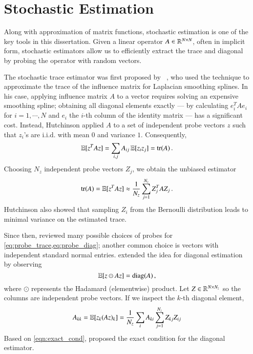 \section{Stochastic Estimation}\label{pre:ste}

Along with approximation of matrix functions, stochastic estimation is
one of the key tools in this dissertation. Given a linear operator $A\in\mathbb{R}^
{N\mathbin{\times} N}$, often in implicit form, stochastic estimators allow us to
efficiently extract the trace and diagonal by probing the operator with random
vectors. 

The stochastic trace estimator was first proposed by~
\citet{hutchinson1990stochastic}, who used the technique to approximate the
trace of the influence matrix for Laplacian smoothing splines. In his case,
applying influence matrix $A$ to a vector requires solving an expensive
smoothing spline; obtaining all diagonal elements exactly --- by calculating
$e_i^TAe_i$ for $i=1,\cdots, N$ and $e_i$ the $i$\hyp{}th column of the identity
matrix --- has a significant cost. Instead, Hutchinson applied $A$ to a set of
independent probe vectors $z$ such that $z_i$'s are i.i.d. with mean $0$ and
variance $1$. Consequently, 
\begin{equation}\label{eq:probe_trace}
	\operatorname{\mathbb{E}}[z^TAz] = \sum_{i,j}A_{ij}\operatorname{\mathbb{E}}[z_iz_j] = \operatorname{tr}(A)\,.
\end{equation}
Choosing $N_z$ independent probe vectors $Z_j$, we obtain the unbiased estimator
\begin{equation}\label{eqn:trace_est}
	\operatorname{tr}(A) = \operatorname{\mathbb{E}}[z^TAz] \approx \frac{1}{N_z}\sum_{j=1}^{N_z}Z_j^TAZ_j\,.
\end{equation}
Hutchinson also showed that sampling $Z_i$ from the Bernoulli distribution
leads to minimal variance on the estimated trace.

Since then, \citet{avron2011randomized} reviewed many possible choices of probes
for \cref{eq:probe_trace,eq:probe_diag}; another common choice is vectors with
independent standard normal entries. \citet{bekas2007estimator} extended the idea for diagonal estimation by
observing
\begin{equation}\label{eq:probe_diag}
	\operatorname{\mathbb{E}}[z\odot Az] = \operatorname{diag}(A)\,,
\end{equation}
where $\odot$ represents the Hadamard (elementwise) product. Let $Z\in\mathbb{R}^
{N\mathbin{\times} N_z}$ so the columns are independent probe vectors. If we inspect the
$k$\hyp{}th diagonal element,
\begin{equation}\label{eqn:exact_cond}
	A_{kk} = \operatorname{\mathbb{E}}[z_k(Az)_k] = \frac{1}{N_z}\sum_{i}A_{ki}\sum_{j=1}^{N_z}Z_{kj}Z_
	{ij}
\end{equation}
Based on \cref{eqn:exact_cond}, \citet{bekas2007estimator} proposed the exact
condition for the diagonal estimator.

